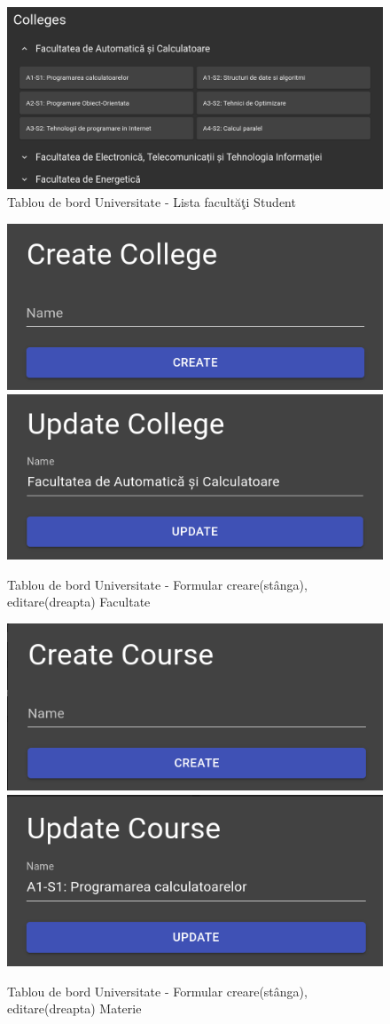 \documentclass[12pt, a4paper, oneside, romanian]{teza-upb}
\begin{document}
\begin{figure}[H]
\centering
\includegraphics*[width=\columnwidth]{tablou-de-bord-universitate-lista-facultati-student}
\caption{Tablou de bord Universitate - Lista facultăţi Student}
\label{tablou-de-bord-universitate-lista-facultati-student}
\end{figure}

\begin{figure}[H]
\centering
\includegraphics*[width=0.45\columnwidth]{tablou-de-bord-universitate-formular-creare-facultate}
\includegraphics*[width=0.45\columnwidth]{tablou-de-bord-universitate-formular-editare-facultate}
\caption{Tablou de bord Universitate - Formular creare(stânga), editare(dreapta) Facultate}
\label{tablou-de-bord-universitate-formular-facultate}
\end{figure}

\begin{figure}[H]
\centering
\includegraphics*[width=0.45\columnwidth]{tablou-de-bord-universitate-formular-creare-materie}
\includegraphics*[width=0.45\columnwidth]{tablou-de-bord-universitate-formular-editare-materie}
\caption{Tablou de bord Universitate - Formular creare(stânga), editare(dreapta) Materie}
\label{tablou-de-bord-universitate-formular-materie}
\end{figure}
\end{document}
